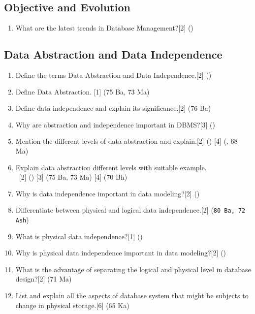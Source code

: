 \documentclass[12pt]{article}
\newcommand{\enter}{\\\textcolor{white}{1}}
\begin{document}
        \subsection{Objective and Evolution}
        \begin{enumerate}
        \item What are the latest trends in Database Management?\hfill[2] ()
        \end{enumerate}

    \subsection{Data Abstraction and Data Independence}
    \begin{enumerate}
    \item Define the terms Data Abstraction and Data Independence.\hfill[2] ()
    \item Define Data Abstraction. \hfill[1] (75 Ba, 73 Ma)
    \item Define data independence and explain its significance.\hfill[2] (76 Ba)
    \item Why are abstraction and independence important in DBMS?\hfill[3] ()
    \item Mention the different levels of data abstraction and explain.\hfill[2] () [4] (, 68 Ma)
    \item Explain data abstraction different levels with suitable example.
    \enter\hfill[2] () [3] (75 Ba, 73 Ma) [4] (70 Bh)
    \item Why is data independence important in data modeling?\hfill[2] ()
    \item Differentiate between physical and logical data independence.\hfill[2] (\texttt{80 Ba, 72 Ash})
    \item What is physical data independence?\hfill[1] ()
    \item Why is physical data independence important in data modeling?\hfill[2] ()
    \item What is the advantage of separating the logical and physical level in database design?\hfill[2] (71 Ma)
    \item List and explain all the aspects of database system that might be subjects to change in physical storage.\hfill[6] (65 Ka)
    \end{enumerate}
\end{document}
